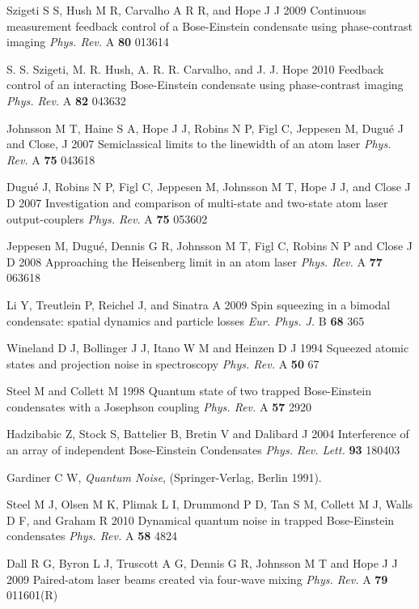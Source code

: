 \documentclass{iopart}
\begin{document}
\begin{thebibliography}{10}
 Szigeti S S, Hush M R, Carvalho A R R, and Hope J J 2009 Continuous measurement feedback control of a Bose-Einstein condensate using phase-contrast imaging \emph{Phys. Rev.} A {\bf 80} 013614

 S. S. Szigeti, M. R. Hush, A. R. R. Carvalho, and J. J. Hope 2010 Feedback control of an interacting Bose-Einstein condensate using phase-contrast imaging \emph{Phys. Rev.} A {\bf 82} 043632

 Johnsson M T, Haine S A, Hope J J, Robins N P, Figl C, Jeppesen M, Dugu{\'{e}} J and Close, J 2007 Semiclassical limits to the linewidth of an atom laser \emph{Phys. Rev.} A {\bf 75} 043618

 Dugu{\'{e}} J, Robins N P, Figl C, Jeppesen M, Johnsson M T, Hope J J, and Close J D 2007 Investigation and comparison of multi-state and two-state atom laser output-couplers \emph{Phys. Rev.} A {\bf 75} 053602

 Jeppesen M, Dugu{\'{e}}, Dennis G R, Johnsson M T, Figl C, Robins N P and Close J D 2008 Approaching the Heisenberg limit in an atom laser \emph{Phys. Rev.} A {\bf 77} 063618

 Li Y, Treutlein P, Reichel J, and Sinatra A 2009 Spin squeezing in a bimodal condensate: spatial dynamics and particle losses \emph{Eur. Phys. J.} B {\bf 68} 365

 Wineland D J, Bollinger J J, Itano W M and Heinzen D J 1994 Squeezed atomic states and projection noise in spectroscopy \emph{Phys. Rev.} A {\bf 50} 67

 Steel M and Collett M 1998 Quantum state of two trapped Bose-Einstein condensates with a Josephson coupling \emph{Phys. Rev.} A {\bf 57} 2920

 Hadzibabic Z, Stock S, Battelier B, Bretin V and Dalibard J 2004 Interference of an array of independent Bose-Einstein Condensates \emph{Phys. Rev. Lett.} {\bf 93} 180403

 Gardiner C W, \emph{Quantum Noise}, (Springer-Verlag, Berlin 1991).

 Steel M J, Olsen M K, Plimak L I, Drummond P D, Tan S M, Collett M J, Walls D F, and Graham R 2010 Dynamical quantum noise in trapped Bose-Einstein condensates \emph{Phys. Rev.} A {\bf 58} 4824

 Dall R G, Byron L J, Truscott A G, Dennis G R, Johnsson M T and Hope J J 2009 Paired-atom laser beams created via four-wave mixing \emph{Phys. Rev.} A {\bf 79} 011601(R)


\end{thebibliography}
\end{document}
